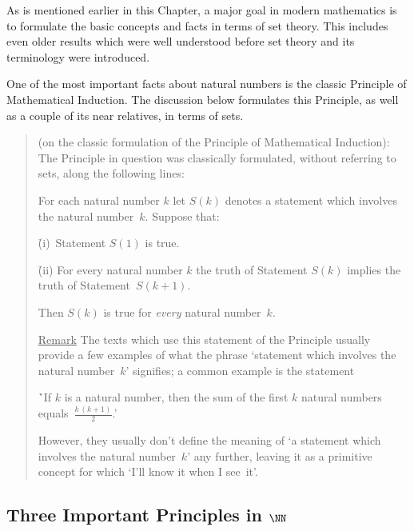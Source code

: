         As is mentioned earlier in this Chapter, a major goal in modern mathematics is to formulate the basic concepts and facts in terms of set theory.
    This includes even older results which were well understood before set theory and its terminology were introduced.

\V


        One of the most important facts about natural numbers is the classic Principle of Mathematical Induction.
        The discussion below formulates this Principle, as well as a couple of its near relatives, in terms of sets.


\begin{quotation}
{\footnotesize \underline{\Note} (on the classic formulation of the Principle of Mathematical Induction):
    The Principle in question was classically formulated, without referring to sets, along the following lines:

\V

        For each natural number $k$ let $S(k)$ denotes a statement which involves the natural number~$k$. Suppose that:

\VA

        \h (i)\, Statement $S(1)$ is true.

        \h (ii) For every natural number $k$ the truth of Statement $S(k)$ implies the truth of Statement~$S(k+1)$.

\VA

\noindent Then $S(k)$ is true for {\em every} natural number~$k$.

        \underline{Remark} The texts which use this statement of the Principle usually provide
    a few examples of what the phrase `statement which involves the natural number~$k$' signifies; a common example is the statement

\VA

        \h `If $k$ is a natural number, then the sum of the first $k$ natural numbers equals~${\displaystyle \frac{k\,(k+1)}{2}}$.'

\VA

\noindent However, they usually don't define the meaning of `a statement which involves the natural number~$k$' any further,
    leaving it as a primitive concept for which `I'll know it when I see~it'.
}%
\end{quotation}


\VV


            \subsection{\small{\bf Three Important Principles in ${\NN}$}}
            \label{PrinA10.11}

